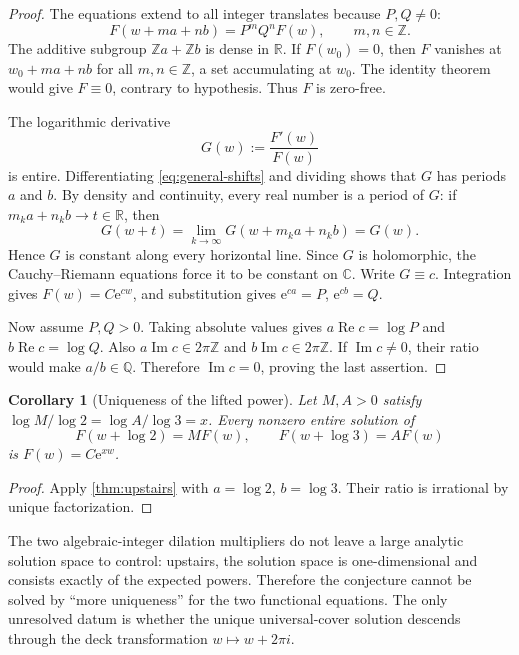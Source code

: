 \documentclass[11pt,oneside]{article}
\newtheorem{corollary}[theorem]{Corollary}
\theoremstyle{definition}
\theoremstyle{remark}
\newcommand{\Z}{\mathbb Z}
\newcommand{\Q}{\mathbb Q}
\newcommand{\R}{\mathbb R}
\newcommand{\C}{\mathbb C}
\newcommand{\e}{\mathrm e}
\begin{document}
\begin{proof}
The equations extend to all integer translates because \(P,Q\ne0\):
\[
  F(w+ma+nb)=P^mQ^nF(w),\qquad m,n\in\Z.
\]
The additive subgroup \(\Z a+\Z b\) is dense in \(\R\).  If \(F(w_0)=0\), then \(F\) vanishes at
\(w_0+ma+nb\) for all \(m,n\in\Z\), a set accumulating at \(w_0\).  The identity theorem would give \(F\equiv0\), contrary to hypothesis.  Thus \(F\) is zero-free.

The logarithmic derivative
\[
  G(w):=\frac{F'(w)}{F(w)}
\]
is entire.  Differentiating \eqref{eq:general-shifts} and dividing shows that \(G\) has periods \(a\) and \(b\).  By density and continuity, every real number is a period of \(G\): if \(m_k a+n_k b\to t\in\R\), then
\[
  G(w+t)=\lim_{k\to\infty}G(w+m_ka+n_kb)=G(w).
\]
Hence \(G\) is constant along every horizontal line.  Since \(G\) is holomorphic, the Cauchy--Riemann equations force it to be constant on \(\C\).  Write \(G\equiv c\).  Integration gives \(F(w)=C\e^{cw}\), and substitution gives \(\e^{ca}=P\), \(\e^{cb}=Q\).

Now assume \(P,Q>0\).  Taking absolute values gives
\(a\operatorname{Re}c=\log P\) and \(b\operatorname{Re}c=\log Q\).  Also
\(a\operatorname{Im}c\in2\pi\Z\) and \(b\operatorname{Im}c\in2\pi\Z\).  If \(\operatorname{Im}c\ne0\), their ratio would make \(a/b\in\Q\).  Therefore \(\operatorname{Im}c=0\), proving the last assertion.
\end{proof}

\begin{corollary}[Uniqueness of the lifted power]
\label{cor:lift-unique}
Let \(M,A>0\) satisfy
\(\log M/\log2=\log A/\log3=x\).  Every nonzero entire solution of
\[
  F(w+\log2)=MF(w),\qquad F(w+\log3)=AF(w)
\]
is \(F(w)=C\e^{xw}\).
\end{corollary}

\begin{proof}
Apply \cref{thm:upstairs} with \(a=\log2\), \(b=\log3\).  Their ratio is irrational by unique factorization.
\end{proof}

\begin{resultbox}
The two algebraic-integer dilation multipliers do not leave a large analytic solution space to control: upstairs, the solution space is one-dimensional and consists exactly of the expected powers.  Therefore the conjecture cannot be solved by ``more uniqueness'' for the two functional equations.  The only unresolved datum is whether the unique universal-cover solution descends through the deck transformation \(w\mapsto w+2\pi i\).
\end{resultbox}
\end{document}
